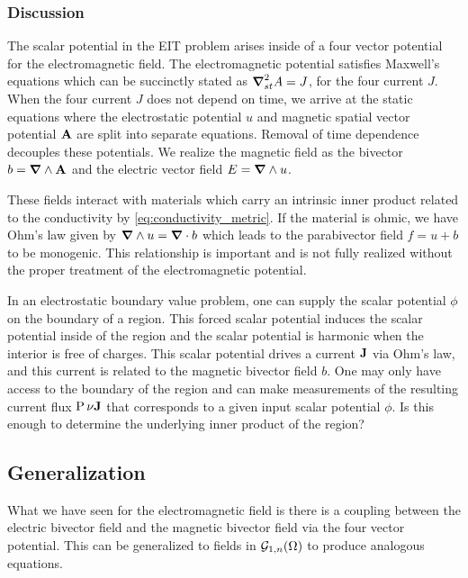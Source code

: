 \subsubsection{Discussion}

The scalar potential in the EIT problem arises inside of a four vector potential for the electromagnetic field.  The electromagnetic potential satisfies Maxwell's equations which can be succinctly stated as $\boldsymbol{\nabla}_{st}^2 A = J$, for the four current $J$.  When the four current $J$ does not depend on time, we arrive at the static equations where the electrostatic potential $u$ and magnetic spatial vector potential $\mathbf{A}$ are split into separate equations. Removal of time dependence decouples these potentials. We realize the magnetic field as the bivector $b=\boldsymbol{\nabla} \wedge \mathbf{A}$ and the electric vector field $E=\boldsymbol{\nabla} \wedge u$. 

These fields interact with materials which carry an intrinsic inner product related to the conductivity by \ref{eq:conductivity_metric}. If the material is ohmic, we have Ohm's law given by $\boldsymbol{\nabla} \wedge u = \boldsymbol{\nabla} \cdot b$ which leads to the parabivector field $f=u+b$ to be monogenic. This relationship is important and is not fully realized without the proper treatment of the electromagnetic potential. 

In an electrostatic boundary value problem, one can supply the scalar potential $\phi$ on the boundary of a region. This forced scalar potential induces the scalar potential inside of the region and the scalar potential is harmonic when the interior is free of charges.  This scalar potential drives a current $\mathbf{J}$ via Ohm's law, and this current is related to the magnetic bivector field $b$. One may only have access to the boundary of the region and can make measurements of the resulting current flux $\operatorname{P}{\nu}{\mathbf{J}}$ that corresponds to a given input scalar potential $\phi$. Is this enough to determine the underlying inner product of the region?


\subsection{Generalization}
What we have seen for the electromagnetic field is there is a coupling between the electric bivector field and the magnetic bivector field via the four vector potential.  This can be generalized to fields in $\mathcal{G}_{1,n}(\Omega)$ to produce analogous equations.


